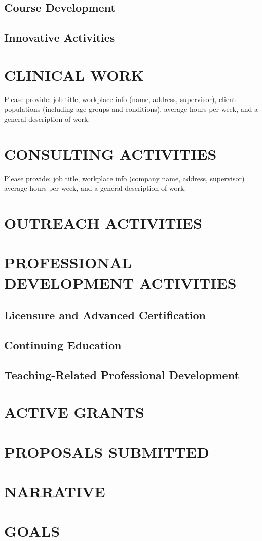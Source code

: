 \documentclass[10pt]{article}
\begin{document}
\subsection{Course Development}

\subsection{Innovative Activities}

\section{CLINICAL WORK}
Please provide: job title, workplace info (name, address, supervisor), client populations (including age groups and conditions), average hours per week, and a general description of work.

\section{CONSULTING ACTIVITIES}
Please provide: job title, workplace info (company name, address, supervisor) average hours per week, and a general description of work.

\section{OUTREACH ACTIVITIES}

\section{PROFESSIONAL DEVELOPMENT ACTIVITIES}
\subsection{Licensure and Advanced Certification}
\subsection{Continuing Education}
\subsection{Teaching-Related Professional Development}

\section{ACTIVE GRANTS}



\section{PROPOSALS SUBMITTED}


\section{NARRATIVE}

\section{GOALS}
\end{document}
